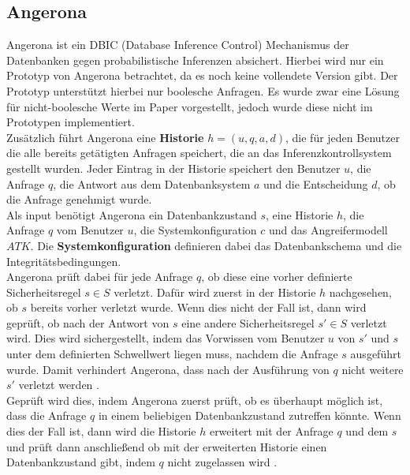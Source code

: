 \documentclass[german,version-2020-11]{uzl-thesis}
\begin{document}
\subsection{Angerona}
Angerona ist ein DBIC (Database Inference Control) Mechanismus der Datenbanken gegen probabilistische Inferenzen absichert. Hierbei wird nur ein Prototyp von Angerona betrachtet, da es noch keine vollendete Version gibt. Der Prototyp unterstützt hierbei nur boolesche Anfragen. Es wurde zwar eine Lösung für nicht-boolesche Werte im Paper vorgestellt, jedoch wurde diese nicht im Prototypen implementiert.\\ 
Zusätzlich führt Angerona eine \textbf{Historie} $h=(u,q,a,d)$, die für jeden Benutzer die alle bereits getätigten Anfragen speichert, die an das Inferenzkontrollsystem gestellt wurden. Jeder Eintrag in der Historie speichert den Benutzer $u$, die Anfrage $q$, die Antwort aus dem Datenbanksystem $a$ und die Entscheidung $d$, ob die Anfrage genehmigt wurde. \\ 
 Als input benötigt Angerona ein Datenbankzustand $s$, eine Historie $h$, die Anfrage $q$ vom Benutzer $u$, die Systemkonfiguration $c$ und das Angreifermodell $ATK$. Die \textbf{Systemkonfiguration} definieren dabei das Datenbankschema und die Integritätsbedingungen.  \\ 
   Angerona prüft dabei für jede Anfrage $q$, ob diese eine vorher definierte Sicherheitsregel $s \in S$ verletzt. Dafür wird zuerst in der Historie $h$ nachgesehen, ob $s$ bereits vorher verletzt wurde. Wenn dies nicht der Fall ist, dann wird geprüft, ob nach der Antwort von $s$ eine andere Sicherheitsregel $s' \in S$  verletzt wird. Dies wird sichergestellt, indem das Vorwissen vom Benutzer $u$ von $s'$ und $s$  unter dem definierten Schwellwert liegen muss, nachdem die Anfrage $s$ ausgeführt wurde. Damit verhindert Angerona, dass nach der Ausführung von $q$ nicht weitere $s'$ verletzt werden .  \\ Geprüft wird dies, indem Angerona zuerst prüft, ob es überhaupt möglich ist, dass die Anfrage $q$ in einem beliebigen Datenbankzustand zutreffen könnte. Wenn dies der Fall ist, dann wird die Historie $h$ erweitert mit der Anfrage $q$ und dem $s$ und prüft dann anschließend ob mit der erweiterten Historie einen Datenbankzustand gibt, indem $q$ nicht zugelassen wird  \cite{6}.
\end{document}
